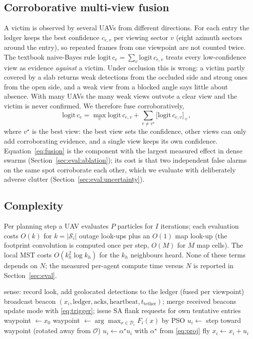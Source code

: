 \subsection{Corroborative multi-view fusion}\label{sec:fusion}
A victim is observed by several UAVs from different directions. For each entry the ledger keeps the
best confidence $c_{e,v}$ per viewing sector $v$ (eight azimuth sectors around the entry), so repeated
frames from one viewpoint are not counted twice. The textbook naive-Bayes rule
$\mathrm{logit}\,c_e=\sum_v\mathrm{logit}\,c_{e,v}$ treats every low-confidence view as evidence
\emph{against} a victim. Under occlusion this is wrong: a victim partly covered by a slab returns weak
detections from the occluded side and strong ones from the open side, and a weak view from a blocked
angle says little about absence. With many UAVs the many weak views outvote a clear view and the
victim is never confirmed. We therefore fuse corroboratively,
\begin{equation}
\mathrm{logit}\,c_e=\max_v\mathrm{logit}\,c_{e,v}+\sum_{v\neq v^\star}\big[\mathrm{logit}\,c_{e,v}\big]_+,
\label{eq:fusion}
\end{equation}
where $v^\star$ is the best view: the best view sets the confidence, other views can only add
corroborating evidence, and a single view keeps its own confidence. Equation~\eqref{eq:fusion} is
the component with the largest measured effect in dense swarms (Section~\ref{sec:eval:ablation}); its
cost is that two independent false alarms on the same spot corroborate each other, which we evaluate
with deliberately adverse clutter (Section~\ref{sec:eval:uncertainty}).

\subsection{Complexity}
Per planning step a UAV evaluates $P$ particles for $I$ iterations; each evaluation costs
$O(k)$ for $k=|\mathcal{S}_i|$ outage look-ups plus an $O(1)$ map look-up (the footprint
convolution is computed once per step, $O(M)$ for $M$ map cells). The local MST costs
$O(k_h^2\log k_h)$ for the $k_h$ neighbours heard. None of these terms depends on $N$; the
measured per-agent compute time versus $N$ is reported in Section~\ref{sec:eval}.

\begin{algorithm}[t]\caption{SENTINEL agent $i$ (every slot $\Delta t$)}\label{alg:agent}
\begin{algorithmic}[1]
\State sense: record look, add geolocated detections to the ledger (fused per viewpoint)
\State broadcast beacon $(x_i,\text{ledger},\text{acks},\text{heartbeat},t_{\mathrm{tether}})$; merge received beacons
  \State update mode with \eqref{eq:trigger}; issue SA flank requests for own tentative entries
   \State waypoint $\gets x_0$
  \Else \State waypoint $\gets\arg\max_{x\in\mathcal{D}_i}F_i(x)$ by PSO 
  \EndIf
\EndIf
\State $u_i\gets$ step toward waypoint (rotated away from $\mathcal{O}$)
 \State $u_i\gets\alpha^\star u_i$ with $\alpha^\star$ from \eqref{eq:proj} \EndIf
\State fly $x_i\gets x_i+u_i$
\end{algorithmic}
\end{algorithm}
